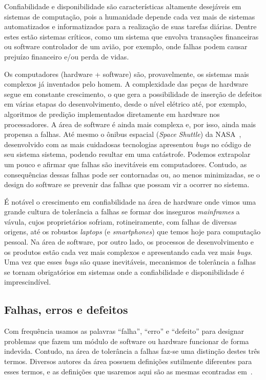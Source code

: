 Confiabilidade e disponibilidade são características altamente desejáveis em sistemas de computação, pois a humanidade depende cada vez mais de sistemas automatizados e informatizados para a realização de suas tarefas diárias. Dentre estes estão sistemas críticos, como um sistema que envolva transações financeiras ou software controlador de um avião, por exemplo, onde falhas podem causar prejuízo financeiro e/ou perda de vidas.

Os computadores (hardware + software) são, provavelmente, os sistemas mais complexos já inventados pelo homem. A complexidade das peças de hardware segue em constante crescimento, o que gera a possibilidade de inserção de defeitos em várias etapas do desenvolvimento, desde o nível elétrico até, por exemplo, algoritmos de predição implementados diretamente em hardware nos processadores. A área de software é ainda mais complexa e, por isso, ainda mais propensa a falhas. Até mesmo o ônibus espacial (\emph{Space Shuttle}) da NASA~\cite{BonacheaOnline}, desenvolvido com as mais cuidadosas tecnologias apresentou \emph{bugs} no código de seu sistema sistema, podendo resultar em uma catástrofe. Podemos extrapolar um pouco e afirmar que falhas são inevitáveis em computadores. Contudo, as consequências dessas falhas pode ser contornadas ou, ao menos minimizadas, se o design do software se prevenir das falhas que possam vir a ocorrer no sistema.

É notável o crescimento em confiabilidade na área de hardware onde vimos uma grande cultura de tolerância a falhas se formar dos inseguros \emph{mainframes} a vávula, cujos proprietários sofriam, rotineiramente, com falhas de diversas origens, até os robustos \emph{laptops} (e \emph{smartphones}) que temos hoje para computação pessoal. Na área de software, por outro lado, os processos de desenvolvimento e os produtos estão cada vez mais complexos e apresentando cada vez mais \emph{bugs}. Uma vez que esses \emph{bugs} são quase inevitáveis, mecanismos de tolerância a falhas se tornam obrigatórios em sistemas onde a confiabilidade e disponibilidade é imprescindível.

\subsection{Falhas, erros e defeitos} %
\label{sub:falhas_erros_e_defeitos}

Com frequência usamos as palavras ``falha'', ``erro'' e ``defeito'' para designar problemas que fazem um módulo de software ou hardware funcionar de forma indevida. Contudo, na área de tolerância a falhas faz-se uma distinção destes três termos. Diversos autores da área possuem definições sutilmente diferentes para esses termos, e as definições que usaremos aqui são as mesmas econtradas em~\cite{koren2007fault}.

